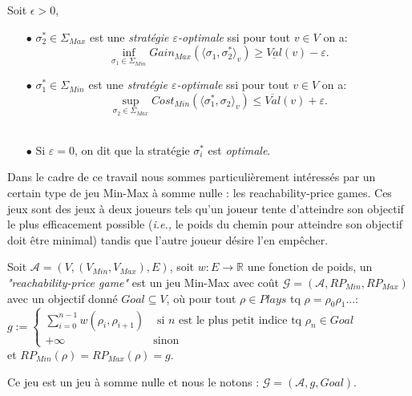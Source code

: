
\begin{defi}
	Soit $\epsilon > 0$,
	\begin{enumerate}
	\item[$\bullet$] $\sigma _{2}^* \in \Sigma _{Max}$ est une \textit{stratégie $\varepsilon$-optimale} ssi pour tout $v \in V $ on a:
	$$ \inf_{\sigma _{1}\in \Sigma_{Min}}  Gain_{Max}(\langle \sigma _{1},\sigma _{2}^* \rangle_v) \geq \underline{Val}(v) - \varepsilon . $$
	\item[$\bullet$] $\sigma _{1}^* \in \Sigma _{Min}$ est une \textit{stratégie $\varepsilon$-optimale} ssi pour tout $v \in V $ on a:
	$$ \sup_{\sigma _{2}\in \Sigma_{Max}} Cost_{Min}(\langle \sigma _{1}^*,\sigma _{2} \rangle_v) \leq \overline{Val}(v) + \varepsilon .$$\\ 
	\item[$\bullet$] Si $\varepsilon = 0$, on dit que la stratégie $\sigma _{i}^*$ est \textit{optimale}.
	\end{enumerate}
\end{defi}

Dans le cadre de ce travail nous sommes particulièrement intéressés par un certain type de jeu Min-Max à somme nulle : les \og reachability-price games\fg. Ces jeux sont des jeux à deux joueurs tels qu'un joueur tente d'atteindre son objectif le plus efficacement possible (\emph{i.e.,} le poids du chemin pour atteindre son objectif doit être minimal) tandis que l'autre joueur désire l'en empêcher. 

\begin{defi}
	Soit $\mathcal{A} = (V, (V_{Min}, V_{Max}), E) $, soit $w: E \rightarrow \mathbb{R}$ une fonction de poids,
	un \textit{"reachability-price game"} est un jeu Min-Max avec coût $\mathcal{G} = (\mathcal{A},RP_{Min},RP_{Max})$\\ avec un objectif donné $Goal \subseteq V$, où pour tout $\rho \in Plays$ tq $\rho = \rho _{0}\rho _{1}...$:\\
	
	$g :=\begin{cases}
									\sum_{i = 0}^{n-1} w(\rho_{i},\rho_{i+1}) & \text{ si } n \text{ est le plus petit indice tq } \rho_{n}\in 					  Goal\\
									+\infty & \text{sinon}
									\end{cases}$ \\
	et $RP_{Min}(\rho)=RP_{Max}(\rho) = g$.
									
  \noindent Ce jeu est un jeu à somme nulle et nous le notons : $\mathcal{G} = (\mathcal{A}, g , Goal)$.
\end{defi}

